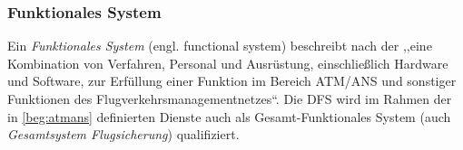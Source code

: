 \subsubsection{Funktionales System}

Ein \textit{Funktionales System} (engl. functional system) beschreibt nach der  ,,eine Kombination von Verfahren, Personal und Ausrüstung, einschließlich Hardware und Software, zur Erfüllung einer Funktion im Bereich \acs{ATM}/\acs{ANS} und sonstiger Funktionen des Flugverkehrsmanagementnetzes``.
\cite[Anh. I Abs. 56]{2017R0373}
Die \acf{DFS} wird im Rahmen der in \ref{beg:atmans} definierten Dienste auch als Gesamt-Funktionales System (auch \textit{Gesamtsystem Flugsicherung}) qualifiziert.
\cite[17]{ba_technik}


